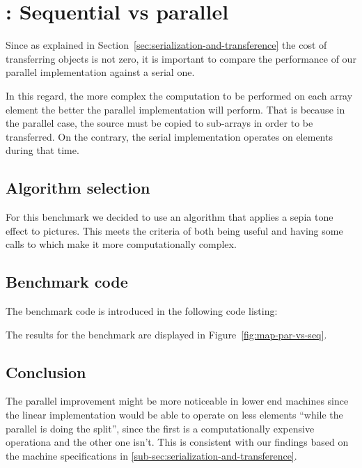 \section{: Sequential vs parallel}

Since as explained in Section~\ref{sec:serialization-and-transference} the cost of transferring objects is not zero, it is important to compare the performance of our parallel implementation against a serial one.

In this regard, the more complex the computation to be performed on each array element the better the parallel implementation will perform. That is because in the parallel case, the source \ttarray{} must be copied to sub-arrays in order to be transferred. On the contrary, the serial implementation operates on elements during that time.

\subsection{Algorithm selection}
For this benchmark we decided to use an algorithm that applies a sepia tone effect to pictures. This meets the criteria of both being useful and having some calls to  which make it more computationally complex.

\subsection{Benchmark code}
The benchmark code is introduced in the following code listing:


The results for the benchmark are displayed in Figure~\ref{fig:map-par-vs-seq}.

\subsection{Conclusion}
The parallel improvement might be more noticeable in lower end machines since the linear implementation would be able to operate on less elements ``while the parallel is doing the split'', since the first is a computationally expensive operationa and the other one isn't. This is consistent with our findings based on the machine specifications in \ref{sub-sec:serialization-and-transference}.

\pagebreak